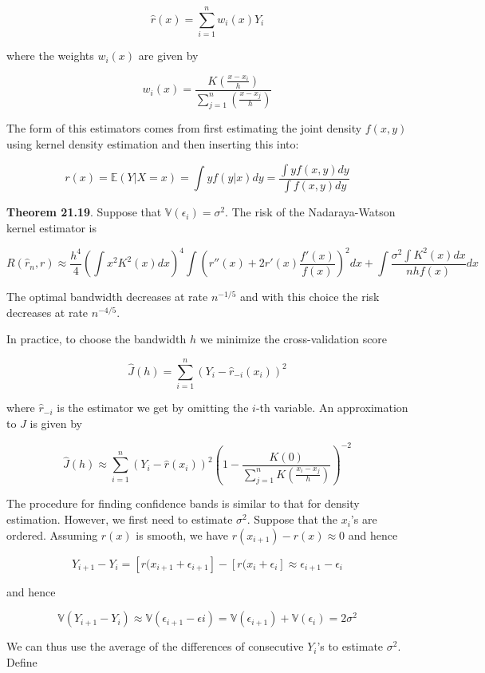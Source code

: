 \[ \hat{r}(x) = \sum_{i=1}^n w_i(x) Y_i\]

where the weights \(w_i(x)\) are given by

\[ w_i(x) = \frac{K\left(\frac{x - x_i}{h}\right)}{\sum_{j=1}^n \left(\frac{x - x_j}{h}\right) } \]

The form of this estimators comes from first estimating the joint
density \(f(x, y)\) using kernel density estimation and then inserting
this into:

\[ r(x) = \mathbb{E}(Y | X = x) = \int y f(y | x) dy = \frac{\int y f(x, y) dy}{\int f(x, y) dy} \]

\textbf{Theorem 21.19}. Suppose that
\(\mathbb{V}(\epsilon_i) = \sigma^2\). The risk of the Nadaraya-Watson
kernel estimator is

\[ R(\hat{r}_n, r) \approx \frac{h^4}{4} 
\left( \int x^2 K^2(x) dx\right)^4
\int \left( r''(x) + 2 r'(x) \frac{f'(x)}{f(x)} \right)^2 dx
+ \int \frac{\sigma^2 \int K^2(x) dx}{nh f(x)} dx
\]

The optimal bandwidth decreases at rate \(n^{-1/5}\) and with this
choice the risk decreases at rate \(n^{-4/5}\).

In practice, to choose the bandwidth \(h\) we minimize the
cross-validation score

\[ \hat{J}(h) = \sum_{i=1}^n (Y_i - \hat{r}_{-i}(x_i))^2\]

where \(\hat{r}_{-i}\) is the estimator we get by omitting the \(i\)-th
variable. An approximation to \(\hat{J}\) is given by

\[ \hat{J}(h) \approx \sum_{i=1}^n (Y_i - \hat{r}(x_i))^2 \left( 1 - \frac{K(0)}{\sum_{j=1}^n K \left( \frac{x_i - x_j}{h} \right)} \right)^{-2}\]

The procedure for finding confidence bands is similar to that for
density estimation. However, we first need to estimate \(\sigma^2\).
Suppose that the \(x_i\)'s are ordered. Assuming \(r(x)\) is smooth, we
have \(r(x_{i+1}) - r(x) \approx 0\) and hence

\[Y_{i+1} - Y_i = \left[ r(x_{i+1} + \epsilon_{i+1} \right] - \left[ r(x_{i} + \epsilon_{i} \right] \approx \epsilon_{i+1} - \epsilon_i \]

and hence

\[ \mathbb{V}(Y_{i+1} - Y_i) \approx \mathbb{V}(\epsilon_{i+1} - \epsilon{i}) = \mathbb{V}(\epsilon_{i+1}) + \mathbb{V}(\epsilon_i) = 2\sigma^2\]

We can thus use the average of the differences of consecutive \(Y_i\)'s
to estimate \(\sigma^2\). Define

